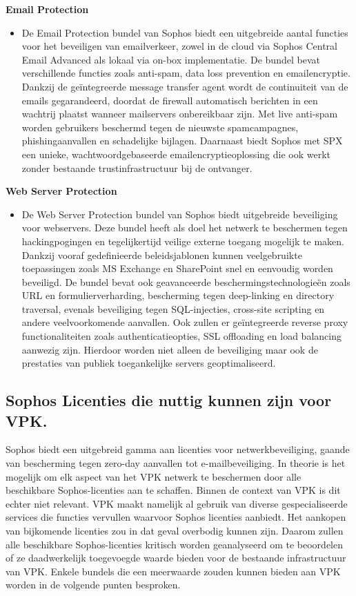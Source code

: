 \textbf{Email Protection}
\begin{itemize}[label=\textbullet]
    \item De Email Protection bundel van Sophos biedt een uitgebreide aantal functies voor het beveiligen van emailverkeer, zowel in de cloud via Sophos Central Email Advanced als lokaal via on-box implementatie. De bundel bevat verschillende functies zoals anti-spam, data loss prevention en emailencryptie. Dankzij de geïntegreerde message transfer agent wordt de continuiteit van de emails gegarandeerd, doordat de firewall automatisch berichten in een wachtrij plaatst wanneer mailservers onbereikbaar zijn. Met live anti-spam worden gebruikers beschermd tegen de nieuwste spamcampagnes, phishingaanvallen en schadelijke bijlagen. Daarnaast biedt Sophos met SPX een unieke, wachtwoordgebaseerde emailencryptieoplossing die ook werkt zonder bestaande trustinfrastructuur bij de ontvanger.
\end{itemize}

\textbf{Web Server Protection}
\begin{itemize}[label=\textbullet]
    \item  De Web Server Protection bundel van Sophos biedt uitgebreide beveiliging voor webservers. Deze bundel heeft als doel het netwerk te beschermen tegen hackingpogingen en tegelijkertijd veilige externe toegang mogelijk te maken. Dankzij vooraf gedefinieerde beleidsjablonen kunnen veelgebruikte toepassingen zoals MS Exchange en SharePoint snel en eenvoudig worden beveiligd. De bundel bevat ook geavanceerde beschermingstechnologieën zoals URL en formulierverharding, bescherming tegen deep-linking en directory traversal, evenals beveiliging tegen SQL-injecties, cross-site scripting en andere veelvoorkomende aanvallen. Ook zullen er geïntegreerde reverse proxy functionaliteiten zoals authenticatieopties, SSL offloading en load balancing aanwezig zijn. Hierdoor worden niet alleen de beveiliging maar ook de prestaties van publiek toegankelijke servers geoptimaliseerd.
\end{itemize}

\subsection{Sophos Licenties die nuttig kunnen zijn voor VPK.}
Sophos biedt een uitgebreid gamma aan licenties voor netwerkbeveiliging, gaande van bescherming tegen zero-day aanvallen tot e-mailbeveiliging. In theorie is het mogelijk om elk aspect van het VPK netwerk te beschermen door alle beschikbare Sophos-licenties aan te schaffen. Binnen de context van VPK is dit echter niet relevant. VPK maakt namelijk al gebruik van diverse gespecialiseerde services die functies vervullen waarvoor Sophos licenties aanbiedt. Het aankopen van bijkomende licenties zou in dat geval overbodig kunnen zijn. Daarom zullen alle beschikbare Sophos-licenties kritisch worden geanalyseerd om te beoordelen of ze daadwerkelijk toegevoegde waarde bieden voor de bestaande infrastructuur van VPK. Enkele bundels die een meerwaarde zouden kunnen bieden aan VPK worden in de volgende punten besproken.


